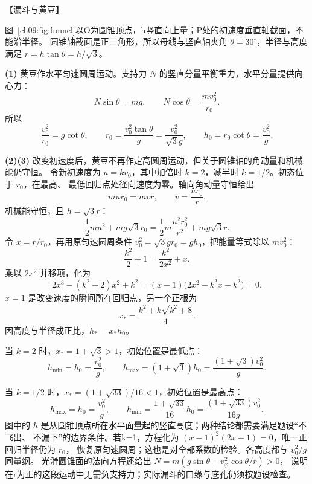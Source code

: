 {\begin{origexamplebox}{【漏斗与黄豆】}
\ThQConeBead
\end{origexamplebox}

\begin{xesolution}
\funnelDiagram

图~\ref{ch09:fig:funnel}以O为圆锥顶点，h竖直向上量；P处的初速度垂直轴截面，不能沿半径。
圆锥轴截面是正三角形，所以母线与竖直轴夹角 $\theta=30^\circ$，半径与高度满足
$r=h\tan\theta=h/\sqrt3$。

\textbf{(1)} 黄豆作水平匀速圆周运动。支持力 $N$ 的竖直分量平衡重力，水平分量提供向心力：
\[
 N\sin\theta=mg,
 \qquad
 N\cos\theta=\frac{mv_0^2}{r_0}.
\]
所以
\[
 \frac{v_0^2}{r_0}=g\cot\theta,
 \qquad r_0=\frac{v_0^2\tan\theta}{g}=\boxed{\frac{v_0^2}{\sqrt3g}},
 \qquad
 h_0=r_0\cot\theta=\boxed{\frac{v_0^2}{g}}.
\]

\textbf{(2)(3)} 改变初速度后，黄豆不再作定高圆周运动，但关于圆锥轴的角动量和机械能仍守恒。
令新初速度为 $u=kv_0$，其中加倍时 $k=2$，减半时 $k=1/2$。初态位于 $r_0$，在最高、
最低回归点处径向速度为零。轴向角动量守恒给出
\[
 mur_0=mvr,
 \qquad v=\frac{ur_0}{r}.
\]
机械能守恒，且 $h=\sqrt3r$：
\[
 \frac12mu^2+mg\sqrt3r_0
 =\frac12m\frac{u^2r_0^2}{r^2}+mg\sqrt3r.
\]
令 $x=r/r_0$，再用原匀速圆周条件 $v_0^2=\sqrt3gr_0=gh_0$，把能量等式除以 $mv_0^2$：
\[
 \frac{k^2}{2}+1=\frac{k^2}{2x^2}+x.
\]
乘以 $2x^2$ 并移项，化为
\[
 2x^3-(k^2+2)x^2+k^2
 =(x-1)\bigl(2x^2-k^2x-k^2\bigr)=0.
\]
$x=1$ 是改变速度的瞬间所在回归点，另一个正根为
\[
 x_* =\frac{k^2+k\sqrt{k^2+8}}{4}.
\]
因高度与半径成正比，$h_*=x_*h_0$。

当 $k=2$ 时，$x_*=1+\sqrt3>1$，初始位置是最低点：
\[
 \boxed{h_{\min}=h_0=\frac{v_0^2}{g}},
 \qquad
 \boxed{h_{\max}=(1+\sqrt3)h_0
 =\frac{(1+\sqrt3)v_0^2}{g}}.
\]
\end{xesolution}

\begin{solutioncontinuation}
当 $k=1/2$ 时，$x_*=(1+\sqrt{33})/16<1$，初始位置是最高点：
\[
 \boxed{h_{\max}=h_0=\frac{v_0^2}{g}},
 \qquad
 \boxed{h_{\min}=\frac{1+\sqrt{33}}{16}h_0
 =\frac{(1+\sqrt{33})v_0^2}{16g}}.
\]
图中的 $h$ 是从圆锥顶点所在水平面量起的竖直高度；两种结论都需要满足题设“不飞出、
不漏下”的边界条件。若k=1，方程化为 $(x-1)^2(2x+1)=0$，唯一正回归半径仍为 $r_0$，
恢复原匀速圆周；这也是对全部系数的检验。各高度都与 $v_0^2/g$ 同量纲。
光滑圆锥面的法向方程还给出 $N=m(g\sin\theta+v_\varphi^2\cos\theta/r)>0$，
说明在r为正的这段运动中无需负支持力；实际漏斗的口缘与底孔仍须按题设检查。
\end{solutioncontinuation}
}

